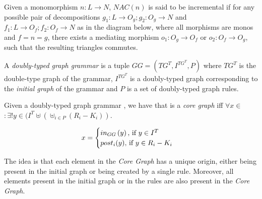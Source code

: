 \begin{definition} Given a monomorphism \mbox{$n : L \rightarrow N$}, $NAC(n)$ is said to be incremental if for any possible pair of decompositions \mbox{$g_1 : L \rightarrow O_g;g_2 : O_g \rightarrow N$} and \mbox{$f_1 : L \rightarrow O_f;f_2 : O_f \rightarrow N$} as in the diagram below, where all morphisms are monos and $f = n = g$, there exists a mediating morphism $o_1 : O_g \rightarrow O_f$ or $o_2 : O_f \rightarrow O_g$, such that the resulting triangles
  commutes.


\end{definition}

\begin{example} 


\end{example}

\begin{definition} A \emph{doubly-typed graph grammar} is a tuple $GG = \left(TG^T, I^{TG^T},P \right)$ where $TG^T$ is the double-type graph of the grammar, $I^{TG^T}$ is a doubly-typed graph corresponding to the \emph{initial graph} of the grammar and $P$ is a set of doubly-typed graph rules. 
\end{definition}

\begin{example}
\end{example}

\begin{definition} Given a doubly-typed graph grammar \doublyTypedGraphGrammarCore{}, we have that \coreGraph{} is a \emph{core graph} iff \mbox{$\forall x \in$ \coreGraph $: \exists! y \in (I^T \uplus (\uplus_{i \in P} (R_i - K_i))$}.


\[ x =
    \begin{cases}
      in_{GG}\parens{y},$ if $y \in I^T\\
      post_i(y),$ if $y \in R_i - K_i\\
    \end{cases}
   \]

  \begin{intuition} The idea is that each element in the \emph{Core Graph} has a unique origin, either being present in the initial graph or being created by a single rule. Moreover, all elements present in the initial graph or in the rules are also present in the \emph{Core Graph}.
\end{intuition}


\end{definition}


